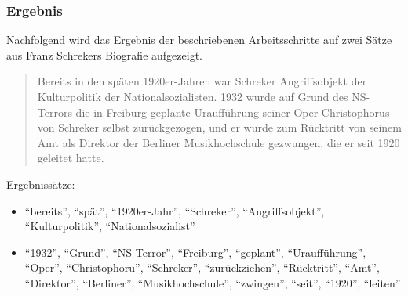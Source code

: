 \documentclass[ngerman]{ttlab-qualify}
\begin{document}
\subsubsection{Ergebnis}
Nachfolgend wird das Ergebnis der beschriebenen Arbeitsschritte auf zwei Sätze aus Franz Schrekers Biografie aufgezeigt.
\begin{quote}Bereits in den späten 1920er-Jahren war Schreker Angriffsobjekt der Kulturpolitik der Nationalsozialisten. 1932 wurde auf Grund des NS-Terrors die in Freiburg geplante Uraufführung seiner Oper Christophorus von Schreker selbst zurückgezogen, und er wurde zum Rücktritt von seinem Amt als Direktor der Berliner Musikhochschule gezwungen, die er seit 1920 geleitet hatte.\\\parencite{wiki:Schreker}\end{quote}
Ergebnissätze:
\begin{itemize}
\item "`bereits"', "`spät"', "`1920er-Jahr"', "`Schreker"', "`Angriffsobjekt"', "`Kulturpolitik"', "`Nationalsozialist"'
\item "`1932"', "`Grund"', "`NS-Terror"', "`Freiburg"', "`geplant"', "`Uraufführung"', "`Oper"', "`Christophoru"', "`Schreker"', "`zurückziehen"', "`Rücktritt"', "`Amt"', "`Direktor"', "`Berliner"', "`Musikhochschule"', "`zwingen"', "`seit"', "`1920"', "`leiten"'
\end{itemize}
\end{document}
